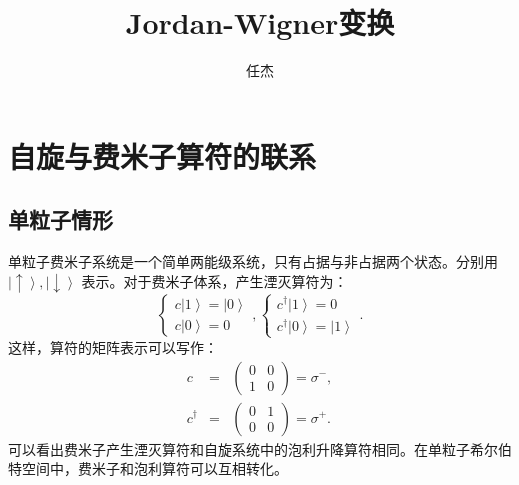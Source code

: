 \documentclass[10pt,UTF8]{ctexart}
\begin{document}
\title{Jordan-Wigner变换}
\date{任杰}

\maketitle


\section*{自旋与费米子算符的联系}
\subsection*{单粒子情形}
\noindent 单粒子费米子系统是一个简单两能级系统，只有占据与非占据两个状态。分别用 $\left|\uparrow\right\rangle ,\left|\downarrow\right\rangle$ 表示。对于费米子体系，产生湮灭算符为：
\begin{equation}
	\begin{cases}
		c\left|1\right\rangle =\left|0\right\rangle \\ 
		c\left|0\right\rangle =0
	\end{cases},
	\begin{cases}
		c^{\dagger}\left|1\right\rangle =0 \\ 
		c^{\dagger}\left|0\right\rangle =\left|1\right\rangle
	\end{cases}.
\end{equation}
这样，算符的矩阵表示可以写作：
\begin{eqnarray}
	c &=& \left(
	\begin{array}{cc} 
		0 & 0\\ 
		1 & 0 
	\end{array}
	\right)=\sigma^{-}, \\
	c^{\dagger} &=& \left(
	\begin{array}{cc} 
		0 & 1\\ 
		0 & 0 
	\end{array}\right)=\sigma^{+}.
\end{eqnarray}
可以看出费米子产生湮灭算符和自旋系统中的泡利升降算符相同。在单粒子希尔伯特空间中，费米子和泡利算符可以互相转化。
\end{document}
